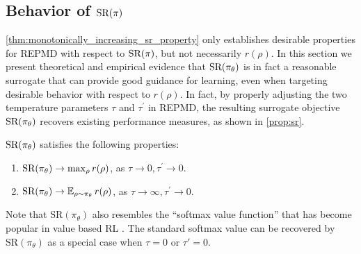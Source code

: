 \subsection{Behavior of $\text{SR}(\pi)$}
\label{subsec:sr}

\cref{thm:monotonically_increasing_sr_property} only establishes
desirable properties for REPMD with respect to $\text{SR}(\pi)$,
but not necessarily $r(\rho)$.
In this section we present theoretical and empirical evidence that
$\text{SR}(\pi_\theta)$ is in fact a reasonable surrogate 
that can provide good guidance for learning,
even when targeting desirable behavior with respect to $r(\rho)$.
In fact, by properly adjusting the two temperature parameters $\tau$ and
$\tau^{\prime}$ in REPMD,
the resulting surrogate objective $\text{SR}(\pi_\theta)$
recovers existing performance measures, as shown in \cref{prop:sr}.

\begin{prop}
\label{prop:sr}
$\text{SR}(\pi_\theta)$ satisfies the following properties:
\begin{enumerate}[label=(\roman*)]
	\item  $\text{SR}(\pi_\theta) \to \max_{\rho}{r(\rho)}$, as $\tau \to 0, \tau^{\prime} \to 0$.
	\item $\text{SR}(\pi_\theta) \to \operatorname*{\mathbb{E}}_{\rho \sim \pi_\theta}{r(\rho)}$, as $\tau \to \infty, \tau^{\prime} \to 0$. 
\end{enumerate}	
\end{prop}

\begin{remk}
Note that $\text{SR}(\pi_\theta)$ also resembles the 
``softmax value function'' that 
has become popular in value based RL
\citep{nachum2017bridging,haarnoja2018soft,ding2017cold}.
The standard softmax value can be recovered by
$\text{SR}(\pi_\theta)$ as a special case when $\tau = 0$ or $\tau'=0$. 
\end{remk}

